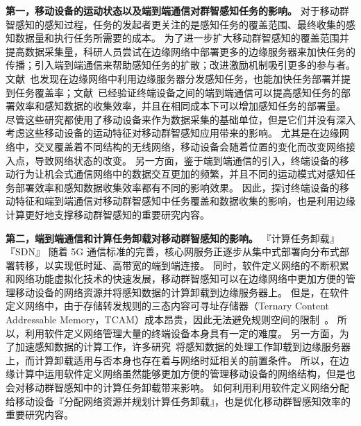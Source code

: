 
\textbf{第一，移动设备的运动状态以及端到端通信对群智感知任务的影响。}
对于移动群智感知的感知过程，任务的发起者更关注的是感知任务的覆盖范围、最终收集的感知数据量和执行任务所需要的成本。
为了进一步扩大移动群智感知的覆盖范围并提高数据采集量，科研人员尝试在边缘网络中部署更多的边缘服务器来加快任务的传播；引入端到端通信来帮助感知任务的扩散；改进激励机制吸引更多的参与者。
文献~\cite{}也发现在边缘网络中利用边缘服务器分发感知任务，也能加快任务部署并提到任务覆盖率；文献~\cite{}已经验证终端设备之间的端到端通信可以提高感知任务的部署效率和感知数据的收集效率，并且在相同成本下可以增加感知任务的部署量。
尽管这些研究都使用了移动设备来作为数据采集的基础单位，但是它们并没有深入考虑这些移动设备的运动特征对移动群智感知应用带来的影响。
尤其是在边缘网络中，交叉覆盖着不同结构的无线网络，移动设备会随着位置的变化而改变网络接入点，导致网络状态的改变。
另一方面，鉴于端到端通信的引入，终端设备的移动行为让机会式通信网络中的数据交互更加的频繁，并且不同的运动模式对感知任务部署效率和感知数据收集效率都有不同的影响效果。
因此，探讨终端设备的移动特征和端到端通信对移动群智感知中任务覆盖和数据收集的影响，也是利用边缘计算更好地支撑移动群智感知的重要研究内容。



\textbf{第二，端到端通信和计算任务卸载对移动群智感知的影响。}
『计算任务卸载』『SDN』
随着 5G 通信标准的完善，核心网服务正逐步从集中式部署向分布式部署转移，以实现低时延、高带宽的端到端连接。
同时，软件定义网络的不断积累和网络功能虚拟化技术的快速发展，移动群智感知可以在边缘网络中更加方便的管理移动设备的网络资源并将感知数据的计算卸载到边缘服务器上。
但是，在软件定义网络中，由于存储转发规则的三态内容可寻址存储器（Ternary Content Addressable Memory，TCAM）成本昂贵，因此无法避免规则空间的限制~\cite{}。
所以，利用软件定义网络管理大量的终端设备本身具有一定的难度。
另一方面，为了加速感知数据的计算工作，许多研究~\cite{}将感知数据的处理工作卸载到边缘服务器上，而计算卸载适用与否本身也存在着与网络时延相关的前置条件。
所以，在边缘计算中运用软件定义网络虽然能够更加方便的管理移动设备的网络结构，但是也会对移动群智感知中的计算任务卸载带来影响。
如何利用利用软件定义网络分配给移动设备『分配网络资源并规划计算任务卸载』，也是优化移动群智感知效率的重要研究内容。


